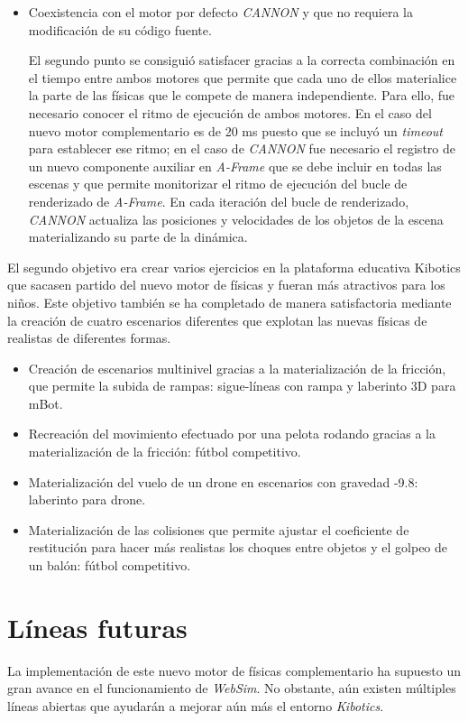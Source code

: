 \begin{itemize}
    \item Coexistencia con el motor por defecto \textit{CANNON} y que no requiera la modificación de su código fuente.
    
    El segundo punto se consiguió satisfacer gracias a la correcta combinación en el tiempo entre ambos motores que permite que cada uno de ellos materialice la parte de las físicas que le compete de manera independiente. Para ello, fue necesario conocer el ritmo de ejecución de ambos motores. En el caso del nuevo motor complementario es de 20 ms puesto que se incluyó un \textit{timeout} para establecer ese ritmo; en el caso de \textit{CANNON} fue necesario el registro de un nuevo componente auxiliar en \textit{A-Frame} que se debe incluir en todas las escenas y que permite monitorizar el ritmo de ejecución del bucle de renderizado de \textit{A-Frame}. En cada iteración del bucle de renderizado, \textit{CANNON} actualiza las posiciones y velocidades de los objetos de la escena materializando su parte de la dinámica.
\end{itemize}

El segundo objetivo era crear varios ejercicios en la plataforma educativa Kibotics que sacasen partido del nuevo motor de físicas y fueran más atractivos para los niños. Este objetivo también se ha completado de manera satisfactoria mediante la creación de cuatro escenarios diferentes que explotan las nuevas físicas de realistas de diferentes formas.

\begin{itemize}
    \item Creación de escenarios multinivel gracias a la materialización de la fricción, que permite la subida de rampas: sigue-líneas con rampa y laberinto 3D para mBot.
    \item Recreación del movimiento efectuado por una pelota rodando gracias a la materialización de la fricción: fútbol competitivo.
    \item Materialización del vuelo de un drone en escenarios con gravedad -9.8: laberinto para drone.
    \item Materialización de las colisiones que permite ajustar el coeficiente de restitución para hacer más realistas los choques entre objetos y el golpeo de un balón: fútbol competitivo.
\end{itemize}


\section{Líneas futuras}
La implementación de este nuevo motor de físicas complementario ha supuesto un gran avance en el funcionamiento de \textit{WebSim}. No obstante, aún existen múltiples líneas abiertas que ayudarán a mejorar aún más el entorno \textit{Kibotics}.

